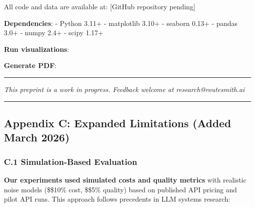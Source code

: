 All code and data are available at: {[}GitHub repository pending{]}

\textbf{Dependencies}: - Python 3.11+ - matplotlib 3.10+ - seaborn 0.13+
- pandas 3.0+ - numpy 2.4+ - scipy 1.17+

\textbf{Run visualizations}:

\begin{Shaded}
\begin{Highlighting}[]
\end{Highlighting}
\end{Shaded}

\textbf{Generate PDF}:

\begin{Shaded}
\begin{Highlighting}[]
\OperatorTok{=}
\end{Highlighting}
\end{Shaded}

\begin{center}\rule{0.5\linewidth}{0.5pt}\end{center}

\emph{This preprint is a work in progress. Feedback welcome at
research@routesmith.ai}

\begin{center}\rule{0.5\linewidth}{0.5pt}\end{center}

\hypertarget{appendix-c-expanded-limitations-added-march-2026}{%
\subsection{Appendix C: Expanded Limitations (Added March
2026)}\label{appendix-c-expanded-limitations-added-march-2026}}

\hypertarget{c.1-simulation-based-evaluation}{%
\subsubsection{C.1 Simulation-Based
Evaluation}\label{c.1-simulation-based-evaluation}}

\textbf{Our experiments used simulated costs and quality metrics} with
realistic noise models (\$\pm\$10\% cost, \$\pm\$5\% quality) based on
published API pricing and pilot API runs. This approach follows
precedents in LLM systems research:

